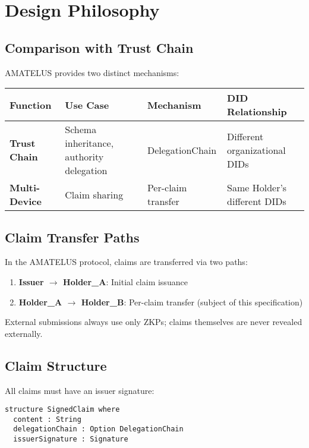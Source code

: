 \section{Design Philosophy}

\subsection{Comparison with Trust Chain}

AMATELUS provides two distinct mechanisms:

\begin{table}[h]
\centering
\begin{tabular}{|l|l|l|l|}
\hline
\textbf{Function} & \textbf{Use Case} & \textbf{Mechanism} & \textbf{DID Relationship} \\
\hline
\textbf{Trust Chain} & Schema inheritance, authority delegation & DelegationChain & Different organizational DIDs \\
\hline
\textbf{Multi-Device} & Claim sharing & Per-claim transfer & Same Holder's different DIDs \\
\hline
\end{tabular}
\end{table}

\subsection{Claim Transfer Paths}

In the AMATELUS protocol, claims are transferred via two paths:

\begin{enumerate}
  \item \textbf{Issuer $\rightarrow$ Holder\_A}: Initial claim issuance
  \item \textbf{Holder\_A $\rightarrow$ Holder\_B}: Per-claim transfer (subject of this specification)
\end{enumerate}

External submissions always use only ZKPs; claims themselves are never revealed externally.

\subsection{Claim Structure}

All claims must have an issuer signature:

\begin{verbatim}
structure SignedClaim where
  content : String
  delegationChain : Option DelegationChain
  issuerSignature : Signature
\end{verbatim}

